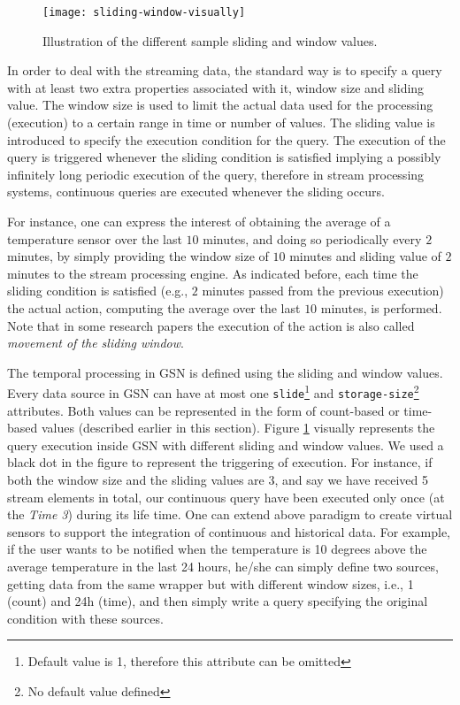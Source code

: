 \begin{figure}
  \centering
  \texttt{[image: sliding-window-visually]}
  \caption{Illustration of the different sample sliding and window values.}
  \label{fig:sliding-window-visually}
\end{figure}

In order to deal with the streaming data, the standard way is to specify
a query with at least two extra properties associated with it,
window size and sliding value. The window size is used to limit
the actual data used for the processing (execution)  to a certain range
in time or number of values. The sliding value is introduced to
specify the execution condition for the query. The execution of the
query is triggered whenever the sliding condition is satisfied implying a possibly infinitely long periodic
execution of the query, therefore in stream processing systems, continuous queries are executed whenever the sliding occurs.

For instance, one can express the interest
of obtaining the average of a temperature sensor over the last $10$
minutes, and doing so periodically every $2$ minutes, by simply
providing the window size of $10$ minutes and sliding value of $2$
minutes to the stream processing engine. As indicated before, each
time the sliding condition is satisfied (e.g., $2$ minutes passed from
the previous execution) the actual action, computing the average over the last $10$
minutes, is performed. Note that in some research papers the
execution of the action is also called \emph{movement of the sliding
window}. 

The temporal processing in GSN is defined using the sliding and window values. Every data source in
GSN can have at most one \verb|slide|\footnote{Default value is 1, therefore this attribute can be omitted}
and \verb|storage-size|\footnote{No default value defined} attributes. Both values can be represented
in the form of count-based or time-based values (described earlier in this section).
Figure \ref{fig:sliding-window-visually} visually represents the query execution inside GSN with different sliding and window values.
We used a black dot in the figure to represent the triggering of execution. For instance, if both the window size and the sliding 
values are 3, and say we have received 5 stream elements in total, our continuous query have been executed only once (at the \emph{Time 3}) during its life time. 
One can extend above paradigm to create virtual sensors to support the integration of continuous and
historical data. For example, if the user wants to be notified when the temperature is 10 degrees above the average temperature in the
last 24 hours, he/she can simply define two sources, getting data from the same wrapper but with different window sizes, i.e., 1
(count) and 24h (time), and then simply write a query specifying the original condition with these sources.


